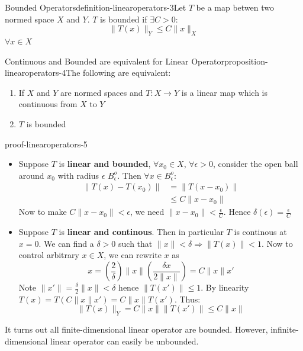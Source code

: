 \begin{mystthmdefinition}{Bounded Operators}{definition-linearoperators-3}Let $T$ be a map betwen two normed space $X$ and $Y$. $T$ is bounded if $\exists C>0$:
\begin{equation}
\|T(x)\|_Y\leq C\|x\|_X
\end{equation}
$\forall x \in X$

\end{mystthmdefinition}
\begin{mystthmproposition}{Continuous and Bounded are equivalent for Linear Operator}{proposition-linearoperators-4}The following are equivalent:

\begin{enumerate}
\item If $X$ and $Y$ are normed spaces and $T:X\to Y$ is a linear map which is continuous from $X$ to $Y$
\item $T$ is bounded
\end{enumerate}

\end{mystthmproposition}
\begin{mystthmproof}{}{proof-linearoperators-5}\begin{itemize}
\item Suppose $T$ is \textbf{linear and bounded}, $\forall x_0 \in X$, $\forall \epsilon > 0$, consider the open ball around $x_0$ with radius $\epsilon$ $B_{\epsilon}^o$. Then $\forall x\in B_{\epsilon}^o$:
\begin{equation}
\begin{aligned}
\|T(x)-T(x_0)\| &= \|T(x-x_0)\| \\
&\leq C\|x-x_0\|
\end{aligned}
\end{equation}
Now to make $C\|x -x_0\|<\epsilon$, we need $\|x -x_0\|<\frac{\epsilon}{C}$. Hence $\delta(\epsilon)=\frac{\epsilon}{C}$


\item Suppose $T$ is \textbf{linear and continous}. Then in particular $T$ is continous at $x=0$. We can find a $\delta >0$ such that $\|x\| < \delta \Rightarrow \|T(x)\| < 1$. Now to control arbitrary $x\in X$, we can rewrite $x$ as
\begin{equation}
x=\left(\frac{2}{\delta }\right)\|x\|\left(\frac{\delta x}{2\|x\|}\right)=C\|x\|x'
\end{equation}
Note $\|x'\|=\frac{\delta }{2}\|x\|<\delta$ hence $\|T(x')\|\leq 1$. By linearity $T(x)=T(C\|x\|x')=C\|x\|T(x')$. Thus:
\begin{equation}
\|T(x)\|_Y=C\|x\|\|T(x')\|\leq C\|x\|
\end{equation}
\end{itemize}

\end{mystthmproof}
It turns out all finite-dimensional linear operator are bounded. However, infinite-dimensional linear operator can easily be unbounded.

